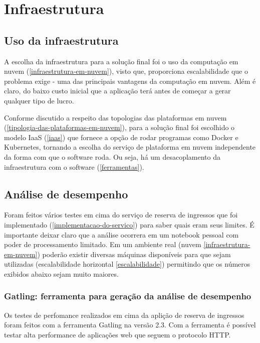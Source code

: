 \chapter{Infraestrutura}

\section{Uso da infraestrutura}

A escolha da infraestrutura para a solução final foi o uso da
computação em nuvem (\autoref{infraestrutura-em-nuvem}), visto que, proporciona
escalabilidade que o problema exige - uma das principais vantagens da computação em nuvem.
Além é claro, do baixo custo inicial que a aplicação terá antes de começar a gerar qualquer
tipo de lucro.

Conforme discutido a respeito das topologias das plataformas em
nuvem (\autoref{tipologia-das-plataformas-em-nuvem}), para a solução final foi escolhido o
modelo IaaS (\autoref{iaas}) que fornece a opção de rodar programas como Docker e
Kubernetes, tornando a escolha do serviço de plataforma em nuvem independente da forma
com que o software roda. Ou seja, há um desacoplamento da infraestrutura com o software
(\autoref{ferramentas}).

\section{Análise de desempenho}

Foram feitos vários testes em cima do serviço de reserva de ingressos que foi implementado
(\autoref{implementacao-do-servico}) para saber quais eram seus limites.
É importante deixar claro que a análise ocorrera em um notebook pessoal com poder
de processamento limitado. Em um ambiente real (nuvem \autoref{infraestrutura-em-nuvem})
poderão existir diversas máquinas disponíveis para que sejam utilizadas
(escalabilidade horizontal \autoref{escalabilidade})
permitindo que os números exibidos abaixo sejam muito maiores.

\subsection{Gatling: ferramenta para geração da análise de desempenho}

Os testes de perfomance realizados em cima da aplição de reserva de ingressos foram
feitos com a ferramenta Gatling na versão 2.3.
Com a ferramenta é possível testar alta performance de aplicações web
\cite{gatling-docs} que seguem o protocolo HTTP.

